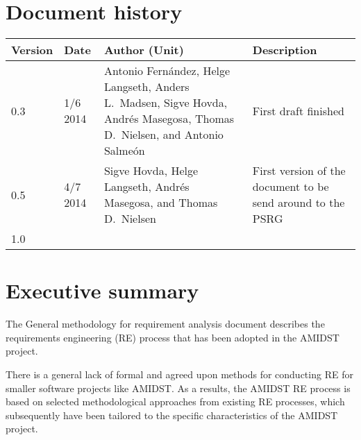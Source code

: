 \documentclass[11pt, oneside]{article}   	%
\begin{document}


%
%



\tableofcontents

\newpage


\section*{Document history}

\begin{table}[htbp]
  \centering
  \begin{tabularx}{\linewidth}{|p{15mm}|p{15mm}|X|X|}\hline
    {\bf Version} & {\bf Date} & {\bf Author (Unit)} & {\bf Description} \\ \hline \hline
    0.3 & 1/6 2014 & Antonio Fern\'andez, Helge Langseth, Anders L.\ Madsen,  Sigve Hovda, Andr\'es Masegosa, Thomas D.\ Nielsen, and Antonio Salme\'on & First draft finished  \\ \hline
    0.5 & 4/7 2014 & Sigve Hovda, Helge Langseth, Andr\'es Masegosa, and Thomas D.\ Nielsen& First version of the document to be send around to the PSRG  \\ \hline
    1.0 & & & \\ \hline \hline
  \end{tabularx}
\end{table}

\newpage



\section{Executive summary}

The General methodology for requirement analysis document describes the requirements engineering (RE) process that has
been adopted in the AMIDST project. 

There is a general lack of formal and agreed upon methods for conducting
RE for smaller software projects like AMIDST. As a results, the AMIDST RE process is based on selected methodological approaches from existing
RE processes, which subsequently have  been 
tailored to the specific characteristics of the AMIDST project. 
\end{document}
